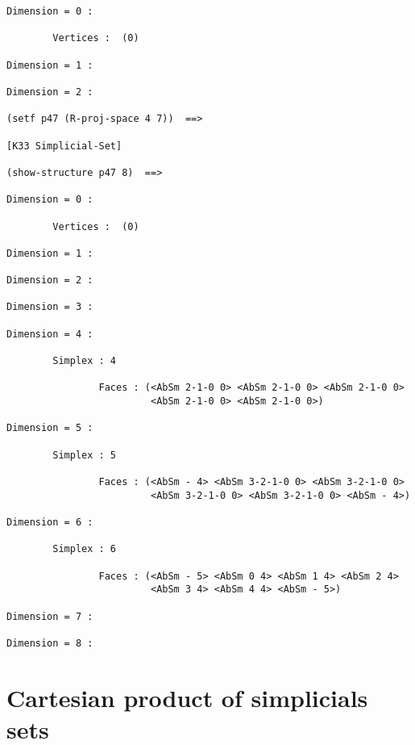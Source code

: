 {{\begin{verbatim}
Dimension = 0 :

        Vertices :  (0)

Dimension = 1 :

Dimension = 2 :

(setf p47 (R-proj-space 4 7))  ==>

[K33 Simplicial-Set]

(show-structure p47 8)  ==>

Dimension = 0 :

        Vertices :  (0)

Dimension = 1 :

Dimension = 2 :

Dimension = 3 :

Dimension = 4 :

        Simplex : 4

                Faces : (<AbSm 2-1-0 0> <AbSm 2-1-0 0> <AbSm 2-1-0 0> 
                         <AbSm 2-1-0 0> <AbSm 2-1-0 0>)

Dimension = 5 :

        Simplex : 5

                Faces : (<AbSm - 4> <AbSm 3-2-1-0 0> <AbSm 3-2-1-0 0> 
                         <AbSm 3-2-1-0 0> <AbSm 3-2-1-0 0> <AbSm - 4>)

Dimension = 6 :

        Simplex : 6

                Faces : (<AbSm - 5> <AbSm 0 4> <AbSm 1 4> <AbSm 2 4> 
                         <AbSm 3 4> <AbSm 4 4> <AbSm - 5>)

Dimension = 7 :

Dimension = 8 :
\end{verbatim}}

\newpage

\section {Cartesian product of  simplicials sets }

}
